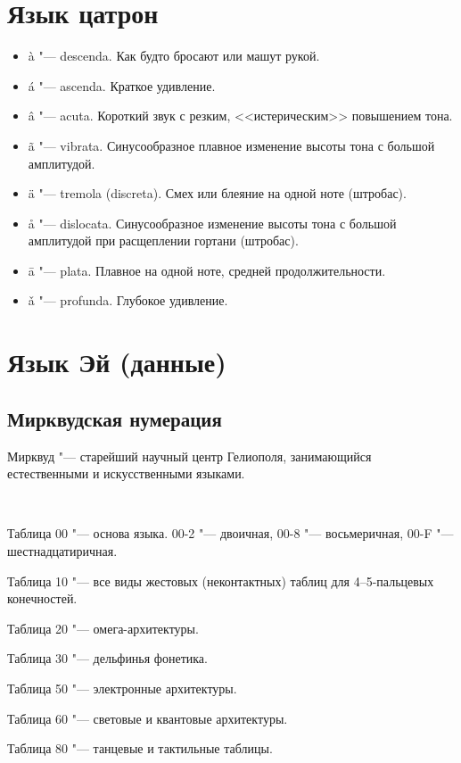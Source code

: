 \documentclass[a4paper,10pt]{book}
\begin{document}
\section{Язык цатрон}

\begin{itemize}
\item \`a "--- descenda. Как будто бросают или машут рукой.
\item \'a "--- ascenda. Краткое удивление.
\item \^a "--- acuta. Короткий звук с резким, <<истерическим>> повышением тона.
\item \~a "--- vibrata. Синусообразное плавное изменение высоты тона с большой 
амплитудой.
\item \"a "--- tremola (discreta). Смех или блеяние на одной ноте (штробас).
\item \r{a} "--- dislocata. Синусообразное изменение высоты тона с большой 
амплитудой при расщеплении гортани (штробас). 
\item \=a "--- plata. Плавное на одной ноте, средней продолжительности.
\item \v{a} "--- profunda. Глубокое удивление.
\end{itemize}

\section{Язык Эй (данные)}

\subsection{Мирквудская нумерация}

Мирквуд "--- старейший научный центр Гелиополя, занимающийся естественными и 
искусственными языками.

~

Таблица 00 "--- основа языка. 00-2 "--- двоичная, 00-8 "--- восьмеричная, 00-F 
"--- шестнадцатиричная.

Таблица 10 "--- все виды жестовых (неконтактных) таблиц для 4--5-пальцевых 
конечностей.

Таблица 20 "--- омега-архитектуры.

Таблица 30 "--- дельфинья фонетика.

Таблица 50 "--- электронные архитектуры.

Таблица 60 "--- световые и квантовые архитектуры.

Таблица 80 "--- танцевые и тактильные таблицы.
\end{document}
